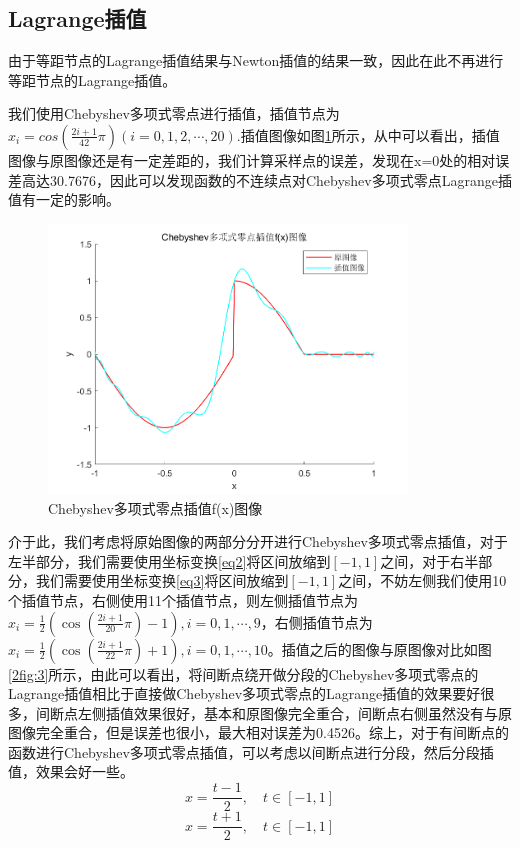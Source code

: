 \documentclass[a4paper]{article}
\begin{document}
\subsection{Lagrange插值}
由于等距节点的Lagrange插值结果与Newton插值的结果一致，因此在此不再进行等距节点的Lagrange插值。

我们使用Chebyshev多项式零点进行插值，插值节点为$x_i=cos(\frac{2i+1}{42}\pi)(i=0,1,2,\cdots,20)$.插值图像如图\ref{2fig:2}所示，从中可以看出，插值图像与原图像还是有一定差距的，我们计算采样点的误差，发现在x=0处的相对误差高达30.7676，因此可以发现函数的不连续点对Chebyshev多项式零点Lagrange插值有一定的影响。

\begin{figure}[!h]
	\centering
	\includegraphics[width=0.85\textwidth]{../code/result/lagchef}
	\caption{\label{2fig:2}Chebyshev多项式零点插值f(x)图像}
\end{figure}

介于此，我们考虑将原始图像的两部分分开进行Chebyshev多项式零点插值，对于左半部分，我们需要使用坐标变换\ref{eq2}将区间放缩到$[-1,1]$之间，对于右半部分，我们需要使用坐标变换\ref{eq3}将区间放缩到$[-1,1]$之间，不妨左侧我们使用10个插值节点，右侧使用11个插值节点，则左侧插值节点为$x_i=\frac{1}{2}(\cos(\frac{2i+1}{20}\pi)-1),i=0,1,\cdots,9$，右侧插值节点为$x_i=\frac{1}{2}(\cos(\frac{2i+1}{22}\pi)+1),i=0,1,\cdots,10$。插值之后的图像与原图像对比如图\ref{2fig:3}所示，由此可以看出，将间断点绕开做分段的Chebyshev多项式零点的Lagrange插值相比于直接做Chebyshev多项式零点的Lagrange插值的效果要好很多，间断点左侧插值效果很好，基本和原图像完全重合，间断点右侧虽然没有与原图像完全重合，但是误差也很小，最大相对误差为0.4526。综上，对于有间断点的函数进行Chebyshev多项式零点插值，可以考虑以间断点进行分段，然后分段插值，效果会好一些。
\begin{equation}
\label{eq2}
x=\frac{t-1}{2},\quad t\in[-1,1] 
\end{equation}
\begin{equation}
\label{eq3}
x=\frac{t+1}{2},\quad t\in[-1,1] 
\end{equation}
\end{document}
